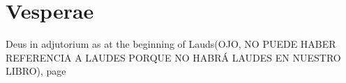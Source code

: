 \documentclass[12pt,a5paper,openany]{memoir}
\begin{document}


% 




% 




% 




% 


\part{Vesperae}

Deus in adjutorium as at the beginning of Lauds(OJO, NO PUEDE HABER REFERENCIA A LAUDES PORQUE NO HABRÁ LAUDES EN NUESTRO LIBRO), page \pageref{deus-memento}

\startParallel
{}
\end{document}
